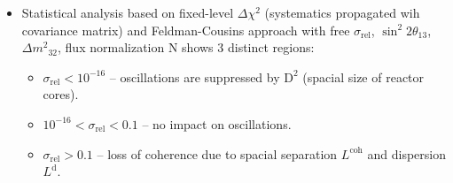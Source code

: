 \documentclass[a2paper, 8pt,hyperref={implicit=false,draft=false},usenames, dvipsnames]{beamer}
\newcommand{\Lcoh}{\ensuremath{L^{\text{coh}}}}
\newcommand{\Ld}{\ensuremath{L^{\text{d}}}}
\newcommand{\Dm}{\ensuremath{\Delta m^2}}
\newcommand{\Important}{\textcolor{BrickRed}}
\newcommand{\srel}{\ensuremath{\sigma_{\text{rel}}}}
\newcommand{\six}{\ensuremath{\sigma_x}}
\begin{document}
\begin{frame}
    \begin{columns}[T]
        \begin{column}{0.55\textwidth}
            \begin{itemize}
            \item Statistical analysis based on \Important{fixed-level
                \ensuremath{\Delta \chi^2}} (systematics propagated wih
                covariance matrix) and \Important{Feldman-Cousins} approach with free
                \Important{\srel}, \Important{\ensuremath{\sin^2
                2\theta_{13}}}, \Important{\ensuremath{\Dm_{32}}}, flux normalization \Important{N}
            shows 3 distinct regions:
                \begin{itemize}
                    \item \Important{$\srel < 10^{-16}$} -- oscillations are suppressed
                        by \ensuremath{\text{D}^2} (spacial size of reactor
                        cores).
                    \item \Important{$10^{-16} < \srel < 0.1$} -- no impact on
                    oscillations.
                    \item \Important{$\srel > 0.1$} -- loss of coherence
                    due to spacial separation
                    \Important{\Lcoh} and dispersion \Important{\Ld}.
                \end{itemize}
        \end{itemize}
        \begin{columns}
            \begin{column}{0.5\textwidth}
                \centering
                \begin{figure}
                    \vspace*{-0.5cm}

\end{figure}
\end{column}
\end{columns}
\end{column}
\end{columns}
\end{frame}
\end{document}
